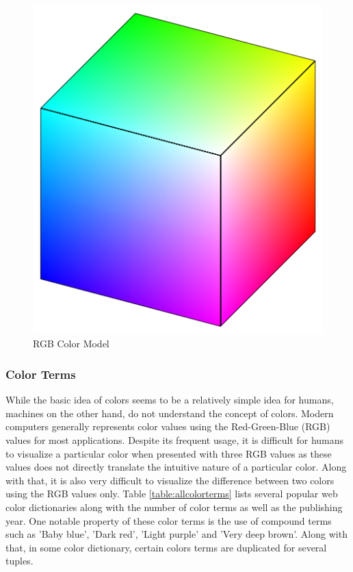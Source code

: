 \begin{figure}[hbt!]\centering
\includegraphics[width=.4\textwidth]{image/lit/rgbcolor.jpg}
\caption{RGB Color Model}
\label{fig:rgb}
\end{figure}

\subsubsection{Color Terms}

While the basic idea of colors seems to be a relatively simple idea for humans, machines on the other hand, do not understand the concept of colors. Modern computers generally represents color values using the Red-Green-Blue (RGB) values for most applications. Despite its frequent usage, it is difficult for humans to visualize a particular color when presented with three RGB values as these values does not directly translate the intuitive nature of a particular color. Along with that, it is also very difficult to visualize the difference between two colors using the RGB values only. Table \ref{table:allcolorterms} lists several popular web color dictionaries along with the number of color terms as well as the publishing year. One notable property of these color terms is the use of compound terms such as 'Baby blue', 'Dark red', 'Light purple' and 'Very deep brown'. Along with that, in some color dictionary, certain colors terms are duplicated for several tuples. 

